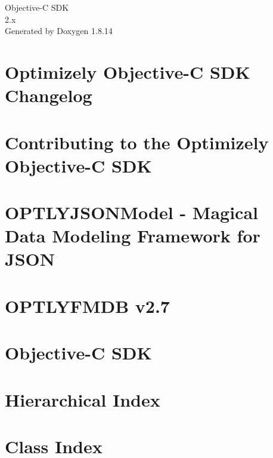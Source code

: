 \documentclass[twoside]{book}
\newcommand{\+}{\discretionary{\mbox{\scriptsize$\hookleftarrow$}}{}{}}
\newcommand{\clearemptydoublepage}{%
  \newpage{\pagestyle{empty}\cleardoublepage}%
}
\begin{document}
\hypersetup{pageanchor=false,
             bookmarksnumbered=true,
             pdfencoding=unicode
            }
\begin{titlepage}
\vspace*{7cm}
\begin{center}%
{\Large Objective-\/C S\+DK \\[1ex]\large 2.\+x }\\
\vspace*{1cm}
{\large Generated by Doxygen 1.8.14}\\
\end{center}
\end{titlepage}
\clearemptydoublepage
{}
\tableofcontents
\clearemptydoublepage
{}
\hypersetup{pageanchor=true}

\chapter{Optimizely Objective-\/C S\+DK Changelog}
\label{autotoc_md0}

\chapter{Contributing to the Optimizely Objective-\/C S\+DK}
\label{autotoc_md8}

\chapter{O\+P\+T\+L\+Y\+J\+S\+O\+N\+Model -\/ Magical Data Modeling Framework for J\+S\+ON}
\label{autotoc_md14}

\chapter{O\+P\+T\+L\+Y\+F\+M\+DB v2.7}
\label{autotoc_md19}

\chapter{Objective-\/C S\+DK}
\label{autotoc_md52}

\chapter{Hierarchical Index}

\chapter{Class Index}

\end{document}

